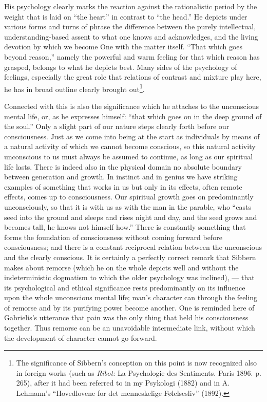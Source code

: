 \documentclass[12pt,a4paper,openany]{book}
\newcommand{\opage}[1]{\marginnote{\footnotesize\textit{[#1]}}}
\begin{document}
His psychology clearly marks the reaction against the
rationalistic period by the weight that is laid on
``the heart'' in contrast to ``the head.'' He depicts under
various forms and turns of phrase the difference between the purely
intellectual, understanding-based assent to what one
knows and acknowledges, and the living devotion by which
we become One with the matter itself. ``That which goes beyond
reason,'' namely the powerful and warm feeling for that which
reason has grasped, belongs to what he depicts best. Many
sides of the psychology of feelings, especially the great role
that relations of contrast and mixture play here, he has in broad outline
clearly brought out\footnote{The significance of Sibbern's conception on this point is
now recognized also in foreign works (such as \emph{Ribot:} La Psychologie des
Sentiments. Paris 1896. p. 265), after it had been referred to in my Psykologi
(1882) and in A. Lehmann's ``Hovedlovene for det menneskelige
Følelsesliv'' (1892).}.

Connected with this is also the significance which he
attaches to the unconscious mental life, or, as he expresses himself:
``that which goes on in the deep ground of the soul.'' Only a slight part
of our nature steps clearly forth before our consciousness. Just as
we come into being at the start as individuals by means of a
natural activity of which we cannot become conscious, so
this natural activity unconscious to us must always be assumed
to continue, as long as our spiritual life lasts. There is
indeed also in the physical domain no absolute boundary
between generation and growth. In instinct and in genius we have
striking examples of something that works in us but only in
its effects, often remote effects, comes up to
consciousness. Our spiritual growth goes on predominantly
unconsciously, so that it is with us as with the man in the parable, who
``casts seed into the ground and sleeps and rises night and day, and
the seed grows and becomes tall, he knows not himself how.'' There
is constantly something that forms the foundation of consciousness without
\opage{83}coming forward before consciousness; and there is a constant
reciprocal relation between the unconscious and the clearly conscious. It is
certainly a perfectly correct remark that Sibbern makes about
remorse (which he on the whole depicts well and without the
indeterministic dogmatism to which the older psychology was
inclined), --- that its psychological and ethical significance
rests predominantly on its influence upon the whole unconscious
mental life; man's character can through the feeling of remorse
and by its purifying power become another. One is reminded
here of Gabrielis's utterance that pain was the only thing that
held his consciousness together. Thus remorse can be
an unavoidable intermediate link, without which the development of character
cannot go forward.
\end{document}
